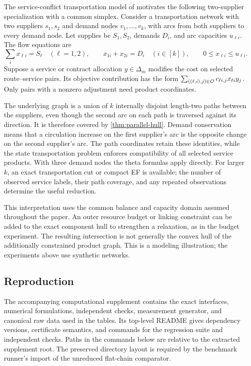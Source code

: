 The service-conflict transportation model of
\citet[Section~4.2]{KhademniaDavarnia2025} motivates the following
two-supplier specialization with a common simplex.
Consider a transportation network with two suppliers
$s_1,s_2$ and demand nodes $v_1,\ldots,v_k$, with arcs from both suppliers
to every demand node. Let supplies be $S_1,S_2$, demands $D_i$, and
arc capacities $u_{\ell i}$. The flow equations are
\[
 \sum_i x_{\ell i}=S_\ell\quad(\ell=1,2),\qquad
 x_{1i}+x_{2i}=D_i\quad(i\in[k]),\qquad
 0\le x_{\ell i}\le u_{\ell i}.
\]
Suppose a service or contract allocation $y\in\Delta_m$ modifies the
cost on selected route--service pairs. Its objective contribution has the
form $\sum_{((\ell,i),j)\in\mathcal O}c_{\ell i,j}x_{\ell i}y_j$.
Only pairs with a nonzero adjustment need product coordinates.

The underlying graph is a union of $k$ internally disjoint length-two
paths between the suppliers, even though the second arc on each path is
traversed against its direction. It is therefore covered by
\cref{thm:parallel-hull}. Demand conservation means that a circulation
increase on the first supplier's arc is the opposite change on the second
supplier's arc. The path coordinates retain these identities, while the
state transportation problem enforces compatibility of all selected service
products. With three demand nodes the theta formulas apply directly.
For larger $k$, an exact transportation cut or compact EF is available;
the number of observed service labels, their path coverage, and any repeated
observations determine the useful reduction.

This interpretation uses the common balance and capacity domain assumed
throughout the paper. An outer resource budget or linking constraint can be
added to the exact component hull to strengthen a relaxation, as in the
budget experiment. The resulting intersection is not generally the convex
hull of the additionally constrained product graph. This is a modeling
illustration; the experiments above use synthetic networks.

\subsection{Reproduction}

The accompanying computational supplement contains the exact interfaces,
numerical formulations, independent checks, measurement generator, and
canonical raw data used in the tables. Its top-level README gives dependency
versions, certificate semantics, and commands for the regression suite and
independent checks. Paths in the commands below are relative to the extracted
supplement root. The preserved directory layout is required by the benchmark
runner's import of the unreduced flat-chain comparator.

